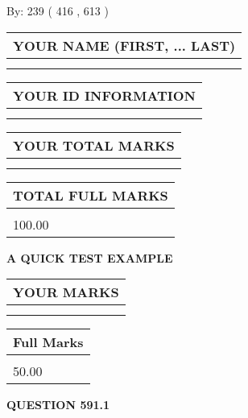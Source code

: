 \documentclass[12pt]{article}
\begin{document}
   
\hspace{1.0in} By: 
 239 ( 416 ,  613 )
   
   
   
   
\newpage 
\setcounter{page}{ 
   591001 } 
   
   
   
   
\noindent\begin{tabular}{|l|}
\hline
YOUR NAME (FIRST, ... LAST)  \\
\hline
 \\ 
 \\ 
\hline
\end{tabular}
\hspace{0.05in} \begin{tabular}{|l|}
\hline
 YOUR   ID   INFORMATION  \\
\hline
 \\ 
 \\ 
\hline
\end{tabular}
   
   
\vspace{0.2in}\noindent\begin{tabular}{|l|}
\hline
YOUR TOTAL MARKS  \\
\hline
 \\ 
 \\ 
\hline
\end{tabular}
\hspace{0.05in} \begin{tabular}{|l|}
\hline
TOTAL FULL MARKS  \\
\hline
 \\ 
100.00 \\
\hline
\end{tabular}
   
   
 \vspace{0.2in}
{\LARGE {\textbf{ A QUICK TEST EXAMPLE}}}
   
   
  
\vspace{0.2in}
  
\noindent\begin{tabular}{|l|}
\hline
 YOUR MARKS  \\
\hline
 \\ 
 \\ 
\hline
\end{tabular}
\hspace{0.05in} \begin{tabular}{|l|}
\hline
 Full Marks  \\
\hline
 \\ 
50.00 \\
\hline
\end{tabular}
{\textbf{\Large{QUESTION
591.1 
}}}
  
\end{document}

